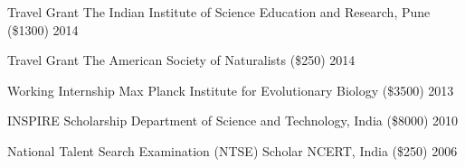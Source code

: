 \begin{cvhonors}
  \cvhonor
    {Travel Grant}
    {The Indian Institute of Science Education and Research, Pune (\$1300)}
    {2014}

  \cvhonor
    {Travel Grant}
    {The American Society of Naturalists (\$250)}
    {2014}

  \cvhonor
    {Working Internship}
    {Max Planck Institute for Evolutionary Biology (\$3500)}
    {2013}

  \cvhonor
    {INSPIRE Scholarship}
    {Department of Science and Technology, India (\$8000)}
    {2010}

  \cvhonor
    {National Talent Search Examination (NTSE) Scholar}
    {NCERT, India (\$250)}
    {2006}
 
\end{cvhonors}
